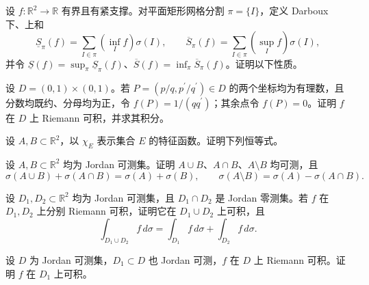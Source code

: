 \noindent\begin{minipage}{\textwidth}
设 $f:\mathbb R^2\to\mathbb R$ 有界且有紧支撑。对平面矩形网格分割 $\pi=\{I\}$，定义 Darboux 下、上和\[\underline S_\pi(f)=\sum_{I\in\pi}(\inf_I f)\sigma(I),\qquad\overline S_\pi(f)=\sum_{I\in\pi}(\sup_I f)\sigma(I),\]并令 $\underline S(f)=\sup_\pi\underline S_\pi(f)$、$\overline S(f)=\inf_\pi\overline S_\pi(f)$。证明以下性质。
\end{minipage}\par\vfill
\noindent\begin{minipage}{\textwidth}
设 $D=(0,1)\times(0,1)$。若 $P=(p/q,p^{\prime}/q^{\prime})\in D$ 的两个坐标均为有理数，且分数均既约、分母均为正，令 $f(P)=1/(qq^{\prime})$；其余点令 $f(P)=0$。证明 $f$ 在 $D$ 上 Riemann 可积，并求其积分。
\end{minipage}\par\vfill
\newpage
\noindent\begin{minipage}{\textwidth}
设 $A,B\subset\mathbb R^2$，以 $\chi_E$ 表示集合 $E$ 的特征函数。证明下列恒等式。
\end{minipage}\par\vfill
\noindent\begin{minipage}{\textwidth}
设 $A,B\subset\mathbb R^2$ 均为 Jordan 可测集。证明 $A\cup B$、$A\cap B$、$A\setminus B$ 均可测，且\[\sigma(A\cup B)+\sigma(A\cap B)=\sigma(A)+\sigma(B),\qquad \sigma(A\setminus B)=\sigma(A)-\sigma(A\cap B).\]
\end{minipage}\par\vfill
\noindent\begin{minipage}{\textwidth}
设 $D_1,D_2\subset\mathbb R^2$ 均为 Jordan 可测集，且 $D_1\cap D_2$ 是 Jordan 零测集。若 $f$ 在 $D_1,D_2$ 上分别 Riemann 可积，证明它在 $D_1\cup D_2$ 上可积，且\[\int_{D_1\cup D_2}f\,d\sigma=\int_{D_1}f\,d\sigma+\int_{D_2}f\,d\sigma.\]
\end{minipage}\par\vfill
\noindent\begin{minipage}{\textwidth}
设 $D$ 为 Jordan 可测集，$D_1\subset D$ 也 Jordan 可测，$f$ 在 $D$ 上 Riemann 可积。证明 $f$ 在 $D_1$ 上可积。
\end{minipage}\par\vfill
